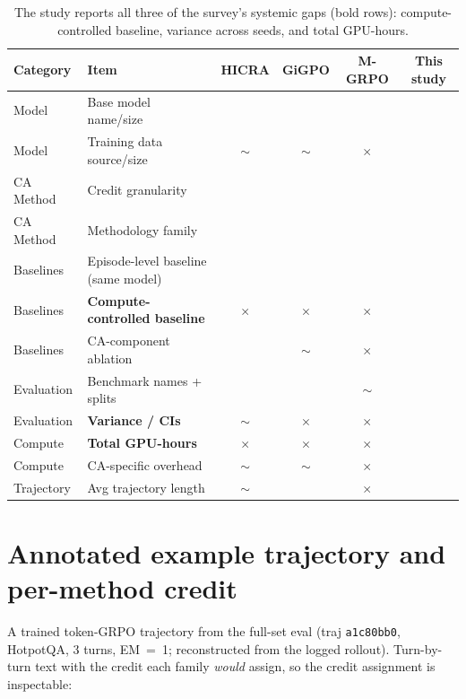 \documentclass[11pt,a4paper]{article}
\newcommand{\chk}{\textcolor{green!55!black}{\checkmark}}
\newcommand{\prt}{\textcolor{orange!85!black}{$\sim$}}
\newcommand{\non}{\textcolor{red!70!black}{$\times$}}
\begin{document}
\begin{table}[h]
\centering\footnotesize
\begin{tabular}{l l c c c c}
\toprule
Category & Item & HICRA & GiGPO & M-GRPO & \textbf{This study} \\
\midrule
Model      & Base model name/size            & \chk & \chk & \chk & \chk \\
Model      & Training data source/size       & \prt & \prt & \non & \chk \\
CA Method  & Credit granularity              & \chk & \chk & \chk & \chk \\
CA Method  & Methodology family              & \chk & \chk & \chk & \chk \\
Baselines  & Episode-level baseline (same model) & \chk & \chk & \chk & \chk \\
Baselines  & \textbf{Compute-controlled baseline} & \non & \non & \non & \chk \\
Baselines  & CA-component ablation            & \chk & \prt & \non & \chk \\
Evaluation & Benchmark names + splits         & \chk & \chk & \prt & \chk \\
Evaluation & \textbf{Variance / CIs}          & \prt & \non & \non & \chk \\
Compute    & \textbf{Total GPU-hours}         & \non & \non & \non & \chk \\
Compute    & CA-specific overhead             & \prt & \prt & \non & \chk \\
Trajectory & Avg trajectory length            & \prt & \chk & \non & \chk \\
\bottomrule
\end{tabular}
\caption{The study reports all three of the survey's systemic gaps (bold rows): compute-controlled
baseline, variance across seeds, and total GPU-hours.}
\end{table}

\section{Annotated example trajectory and per-method credit}

A trained token-GRPO trajectory from the full-set eval (traj \texttt{a1c80bb0}, HotpotQA, 3 turns,
EM~=~1; reconstructed from the logged rollout). Turn-by-turn text with the credit each family
\emph{would} assign, so the credit assignment is inspectable:
\end{document}
